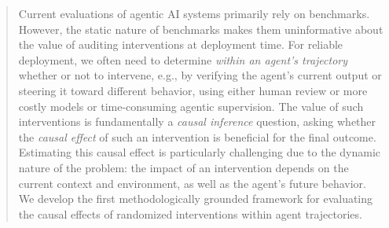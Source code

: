 \begin{abstract}
Current evaluations of agentic AI systems primarily rely on benchmarks. However, the static nature of benchmarks makes them uninformative about the value of auditing interventions at deployment time.
For reliable deployment, we often need to determine {\em within an agent's trajectory} whether or not to intervene, e.g., by verifying the agent's current output or steering it toward different behavior, using either human review or more costly models or time-consuming agentic supervision.
The value of such interventions is fundamentally a {\em causal inference} question, asking whether the {\em causal effect} of such an intervention is beneficial for the final outcome.
Estimating this causal effect is particularly challenging due to the dynamic nature of the problem: the impact of an intervention depends on the current context and environment, as well as the agent's future behavior.
We develop the first methodologically grounded framework for evaluating the causal effects of randomized interventions within agent trajectories.

\end{abstract}
